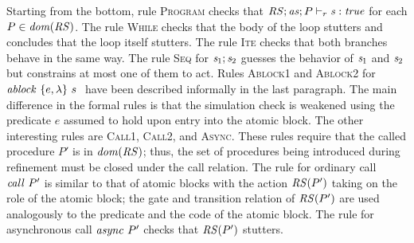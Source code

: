 Starting from the bottom, rule \textsc{Program} checks that $\mathit{RS};\mathit{as};P \vdash_r \mathit{s} : \mathit{true}$
for each $P \in \mathit{dom}(\mathit{RS})$.
The rule \textsc{While} checks that the body of the loop stutters and concludes that the loop itself stutters.
The rule \textsc{Ite} checks that both branches behave in the same way.
The rule \textsc{Seq} for $\mathit{s}_1;\mathit{s}_2$ guesses the behavior of $\mathit{s}_1$ and $\mathit{s}_2$ but constrains
at most one of them to act.
Rules \textsc{Ablock1} and \textsc{Ablock2} for $\mathit{ablock}\ {\{e,\lambda\}}\ {s}\ $ have been described informally in the last paragraph.  
The main difference in the formal rules is that the simulation check is weakened using the predicate $e$
assumed to hold upon entry into the atomic block.
The other interesting rules are \textsc{Call1}, \textsc{Call2}, and \textsc{Async}.
These rules require that the called procedure $P'$ is in $\mathit{dom}(\mathit{RS})$;
thus, the set of procedures being introduced during refinement must be closed under the call relation.
The rule for ordinary call $\mathit{call}\ P'$ is similar to that of atomic blocks with the action $\mathit{RS}(P')$
taking on the role of the atomic block;
the gate and transition relation of $\mathit{RS}(P')$ are used analogously to the predicate and the code of the atomic block.
The rule for asynchronous call $\mathit{async}\ P'$ checks that $\mathit{RS}(P')$ stutters.


